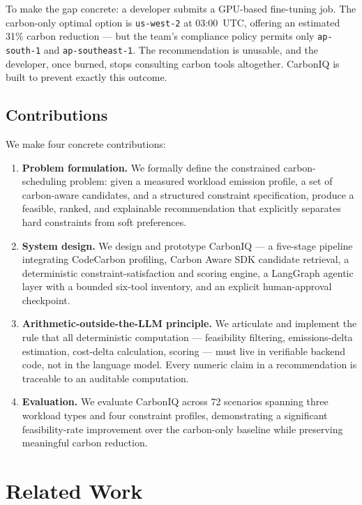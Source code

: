 ﻿\documentclass[conference]{IEEEtran}
\begin{document}
To make the gap concrete: a developer submits a GPU-based fine-tuning job.
The carbon-only optimal option is \texttt{us-west-2} at 03:00~UTC, offering an
estimated 31\% carbon reduction --- but the team's compliance policy permits only
\texttt{ap-south-1} and \texttt{ap-southeast-1}.
The recommendation is unusable, and the developer, once burned, stops consulting
carbon tools altogether.
CarbonIQ is built to prevent exactly this outcome.

\subsection{Contributions}

We make four concrete contributions:
\begin{enumerate}
\item \textbf{Problem formulation.}
We formally define the constrained carbon-scheduling problem: given a measured workload
emission profile, a set of carbon-aware candidates, and a structured constraint
specification, produce a feasible, ranked, and explainable recommendation that
explicitly separates hard constraints from soft preferences.

\item \textbf{System design.}
We design and prototype CarbonIQ --- a five-stage pipeline integrating CodeCarbon
profiling, Carbon Aware SDK candidate retrieval, a deterministic
constraint-satisfaction and scoring engine, a LangGraph agentic layer with a bounded
six-tool inventory, and an explicit human-approval checkpoint.

\item \textbf{Arithmetic-outside-the-LLM principle.}
We articulate and implement the rule that all deterministic computation ---
feasibility filtering, emissions-delta estimation, cost-delta calculation, scoring ---
must live in verifiable backend code, not in the language model. Every numeric claim
in a recommendation is traceable to an auditable computation.

\item \textbf{Evaluation.}
We evaluate CarbonIQ across 72 scenarios spanning three workload types and four
constraint profiles, demonstrating a significant feasibility-rate improvement over
the carbon-only baseline while preserving meaningful carbon reduction.
\end{enumerate}

\section{Related Work}
\end{document}
